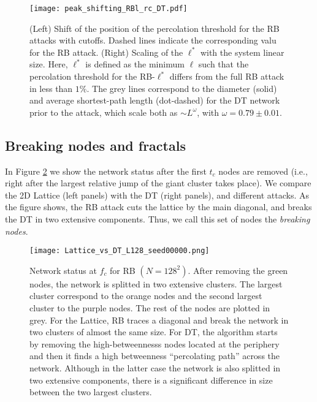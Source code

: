 \documentclass{article}
\begin{document}
\begin{figure}[h]
\centering
\texttt{[image: peak\_shifting\_RBl\_rc\_DT.pdf]}
\caption{\label{fig:rc_per_cutoff} (Left) Shift of the position of the percolation threshold for the RB attacks with cutoffs. Dashed lines indicate the corresponding valu for the RB attack. (Right) Scaling of the $\ell^*$ with the system linear size. Here, $\ell^*$ is defined as the minimum $\ell$ such that the percolation threshold  for the RB-$\ell^*$ differs from the full RB attack in less than $1\%$. The grey lines correspond to the diameter (solid) and average shortest-path length (dot-dashed) for the DT network prior to the attack, which scale both as $\sim L^{\omega}$, with $\omega = 0.79\pm 0.01$.}
\end{figure}


\subsection{Breaking nodes and fractals}

In Figure \ref{fig:attack_draw} we show the network status after the first $t_c$ nodes are removed (i.e., right after the largest relative jump of the giant cluster takes place). We compare the 2D Lattice (left panels) with the DT (right panels), and different attacks. As the figure shows, the RB attack cuts the lattice by the main diagonal, and breaks the DT in two extensive components. Thus, we call this set of nodes the \emph{breaking nodes}. 

\begin{figure}
\centering
\texttt{[image: Lattice\_vs\_DT\_L128\_seed00000.png]}
\caption{\label{fig:attack_draw} Network status at $f_c$ for RB $(N = 128^2)$. After removing the green nodes, the network is splitted in two extensive clusters. The largest cluster correspond to the orange nodes and the second largest cluster to the purple nodes. The rest of the nodes are plotted in grey. For the Lattice, RB traces a diagonal and break the network in two clusters of almost the same size. For DT, the algorithm starts by removing the high-betweennesss nodes located at the periphery and then it finds a high betweenness ``percolating path'' across  the network. Although in the latter case the network is also splitted in two extensive components, there is a significant difference in size between the two largest clusters. }
\end{figure}
\end{document}
